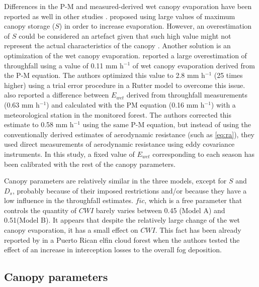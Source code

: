 \documentclass[a4paper,12pt]{article}
\begin{document}
\begin{linenumbers}
Differences in the P-M and measured-derived wet canopy evaporation have been reported as well in other studies \citep{Scatena1990, Dykes1997, Waterlooetal1999, Schellekensetal1999, WallaceandMcJannet2008, Holwerdaetal2012}. \cite{Calderetal1986} proposed using large values of maximum canopy storage ($S$) in order to increase evaporation. However, an overestimation of $S$ could be considered an artefact given that such high value might not represent the actual characteristics of the canopy \citep{Lloydetal1988}. Another solution is an optimization of the wet canopy evaporation. \cite{Schellekensetal1999} reported a large overestimation of throughfall using a value of 0.11 mm h$^{-1}$ of wet canopy evaporation derived from the P-M equation. The authors optimized this value to 2.8 mm h$^{-1}$ (25 times higher) using a trial error procedure in a Rutter model to overcome this issue. \cite{Holwerdaetal2012} also reported a difference between $E_{wet}$ derived from throughfall measurements (0.63 mm h$^{-1}$) and calculated with the PM equation (0.16 mm h$^{-1}$) with a meteorological station in the monitored forest. The authors corrected this estimate to 0.58 mm h$^{-1}$ using the same P-M equation, but instead of using the conventionally derived estimates of aerodynamic resistance (such as \autoref{eq:ra}), they used direct measurements of aerodynamic resistance using eddy covariance instruments. In this study, a fixed value of $E_{wet}$ corresponding to each season has been calibrated with the rest of the canopy parameters.

Canopy parameters are relatively similar in the three models, except for $S$ and $D_s$, probably because of their imposed restrictions and/or because they have a low influence in the throughfall estimates. $fic$, which is a free parameter that controls the quantity of $CWI$ barely varies between 0.45 (Model A) and 0.51(Model B). It appears that despite the relatively large change of the wet canopy evaporation, it has a small effect on $CWI$. This fact has been already reported by \cite{Holwerdaetal2006} in a Puerto Rican elfin cloud forest when the authors tested the effect of an increase in interception losses to the overall fog deposition.

\subsection{Canopy parameters} \label{dis_int_model}


\end{linenumbers}
\end{document}
